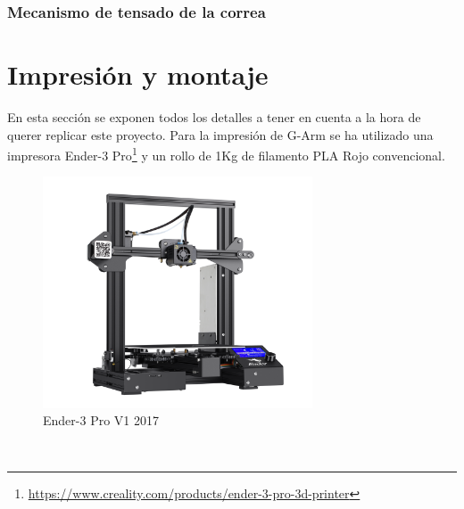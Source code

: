 \subsubsection{Mecanismo de tensado de la correa}

\newpage
\section{Impresión y montaje}
En esta sección se exponen todos los detalles a tener en cuenta a la hora de querer replicar este proyecto. Para la impresión 
de G-Arm se ha utilizado una impresora Ender-3 Pro\footnote{\url{https://www.creality.com/products/ender-3-pro-3d-printer}} y un rollo 
de 1Kg de filamento PLA Rojo convencional.
\begin{figure} [h!]
\begin{center}
  \includegraphics[width=8cm]{figs/ender3.png}
\end{center}
\caption{Ender-3 Pro V1 2017}
\label{fig:ender3pro}
\end{figure}\   

